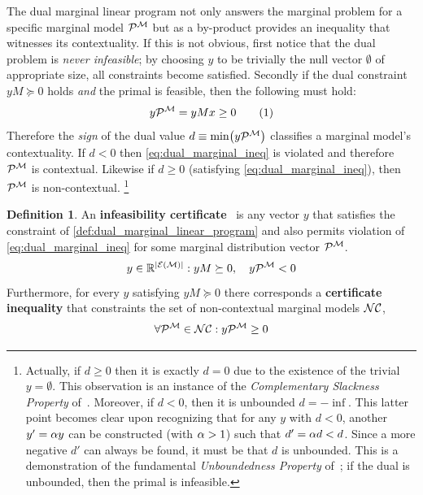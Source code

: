 \documentclass[aps, 10pt, english, twoside, pra, nofootinbib, longbibliography]{revtex4-1}
\theoremstyle{plain}
\theoremstyle{definition}
\newtheorem{definition}[theorem]{Definition}
\theoremstyle{remark}
\newcommand{\mscenario}{\mathcal{M}}
\newcommand{\term}[1]{\textcolor{Mahogany}{\textbf{#1}}}
\newcommand{\tcdot}{} %
\newcommand{\Events}[1]{\s{E}\br{#1}} %
\begin{document}
    The dual marginal linear program not only answers the marginal problem for a specific marginal model $\probvec^{\mscenario}$ but as a by-product provides an inequality that witnesses its contextuality. If this is not obvious, first notice that the dual problem is \textit{never infeasible}; by choosing $y$ to be trivially the null vector $\emptyset$ of appropriate size, all constraints become satisfied. Secondly if the dual constraint $y \tcdot M \succeq 0$ holds \textit{and} the primal is feasible, then the following must hold:
    \[ y \tcdot \probvec^{\mscenario} =  y \tcdot M \tcdot x \geq 0 \eq \label{eq:dual_marginal_ineq} \]
    Therefore the \textit{sign} of the dual value $d \defined \min \br{y \tcdot \probvec^{\mscenario}}$ classifies a marginal model's contextuality. If $d < 0$ then \cref{eq:dual_marginal_ineq} is violated and therefore $\probvec^{\mscenario}$ is contextual. Likewise if $d \geq 0$ (satisfying \cref{eq:dual_marginal_ineq}), then $\probvec^{\mscenario}$ is non-contextual. \footnote{Actually, if $d \geq 0$ then it is exactly $d = 0$ due to the existence of the trivial $y = \emptyset$. This observation is an instance of the \textit{Complementary Slackness Property} of~\cite{Bradley_1977}.  Moreover, if $d < 0$, then it is unbounded $d = -\inf$. This latter point becomes clear upon recognizing that for any $y$ with $d < 0$, another $y' = \alpha y$ can be constructed (with $\alpha > 1$) such that $d' = \alpha d < d$. Since a more negative $d'$ can always be found, it must be that $d$ is unbounded. This is a demonstration of the fundamental \textit{Unboundedness Property} of~\cite{Bradley_1977}; if the dual is unbounded, then the primal is infeasible. }

    \begin{definition} An \term{infeasibility certificate}~\cite{Andersen_2001} is any vector $y$ that satisfies the constraint of \cref{def:dual_marginal_linear_program} and also permits violation of \cref{eq:dual_marginal_ineq} for some marginal distribution vector $\probvec^{\mscenario}$.
    \[ y \in \R^{\abs{\Events{\mscenario}}} : y \tcdot M \succeq 0, \quad y \tcdot \probvec^{\mscenario} < 0 \]
    Furthermore, for every $y$ satisfying $y \tcdot M \succeq 0$ there corresponds a \term{certificate inequality} that constraints the set of non-contextual marginal models $\mathcal{NC}$,
    \[ \forall \probvec^{\mscenario} \in \s{NC} : y \tcdot \probvec^{\mscenario} \geq 0 \]
    \end{definition}
\end{document}
